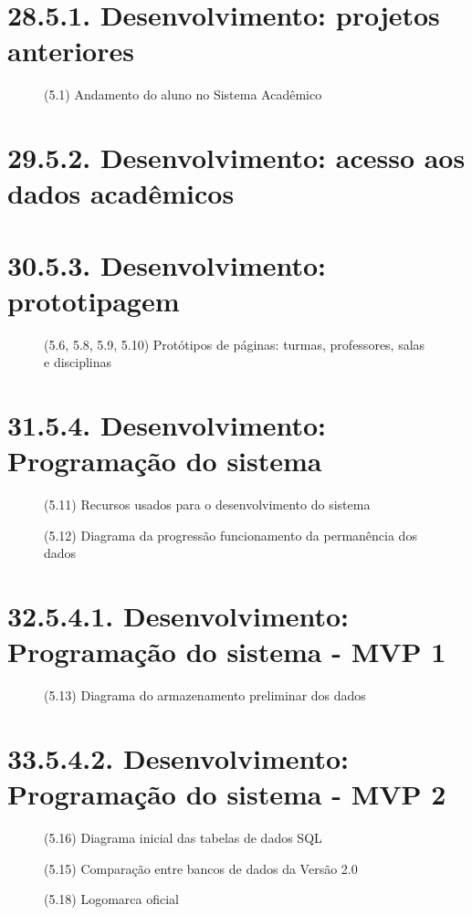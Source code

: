 
\chapter{28.5.1. Desenvolvimento: projetos anteriores}
\begin{figure}[htpb]\caption{(5.1) Andamento do aluno no Sistema Acadêmico}\end{figure}
\chapter*{29.5.2. Desenvolvimento: acesso aos dados acadêmicos}
\chapter*{30.5.3. Desenvolvimento: prototipagem}
\begin{figure}[htpb]\caption{(5.6, 5.8, 5.9, 5.10) Protótipos de páginas: turmas, professores, salas e disciplinas}\end{figure}
\chapter*{31.5.4. Desenvolvimento: Programação do sistema}
\begin{figure}[htpb]\caption{(5.11) Recursos usados para o desenvolvimento do sistema}\end{figure}
\begin{figure}[htpb]\caption{(5.12) Diagrama da progressão funcionamento da permanência dos dados}\end{figure}
\chapter*{32.5.4.1. Desenvolvimento: Programação do sistema - MVP 1}
\begin{figure}[htpb]\caption{(5.13) Diagrama do armazenamento preliminar dos dados}\end{figure}
\chapter*{33.5.4.2. Desenvolvimento: Programação do sistema - MVP 2}
\begin{figure}[htpb]\caption{(5.16) Diagrama inicial das tabelas de dados SQL}\end{figure}
\begin{figure}[htpb]\caption{(5.15) Comparação entre bancos de dados da Versão 2.0}\end{figure}
\begin{figure}[htpb]\caption{(5.18) Logomarca oficial}\end{figure}

